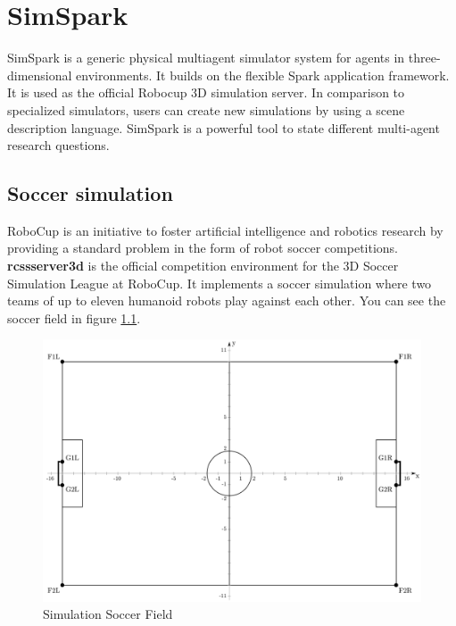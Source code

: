 \chapter{SimSpark}
\label{SimSpark}

SimSpark is a generic physical multiagent simulator system for agents in three-dimensional environments. It builds on the flexible Spark application framework.
It is used as the official Robocup 3D simulation server. In comparison to specialized simulators, users can create new simulations by using a scene description language. SimSpark is a powerful tool to state different multi-agent research questions.
\section{Soccer simulation}
RoboCup is an initiative to foster artificial intelligence and robotics research by providing a standard problem in the form of robot soccer competitions. { \bf rcssserver3d} is the official competition environment for the 3D Soccer Simulation League at RoboCup. It implements a soccer simulation where two teams of up to eleven humanoid robots play against each other. You can see the soccer field in figure \ref{fig:SimulationSoccerField}.
\begin{figure}[ht!]
\centering
  \includegraphics[scale=1.5]{Chapter2/figures/1280px-SoccerSimulation_FieldPlan.png}
  \caption{Simulation Soccer Field} 
  \label{fig:SimulationSoccerField}
\end{figure}
